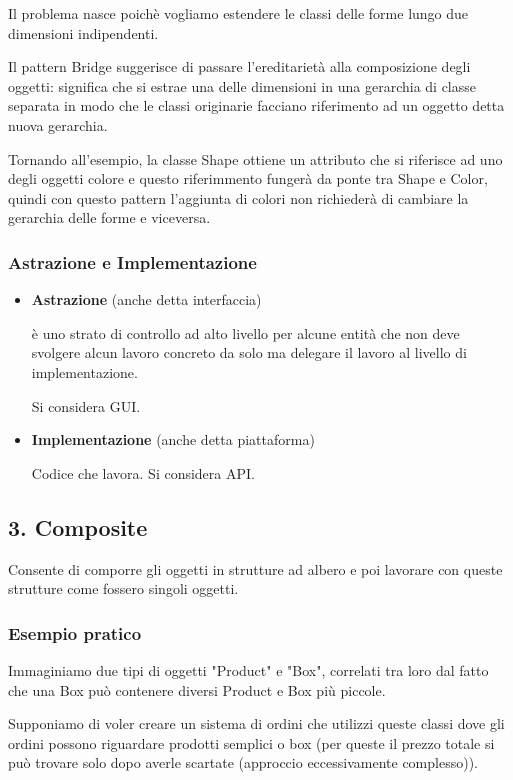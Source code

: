 \documentclass{report}
\begin{document}
\noindent
Il problema nasce poichè vogliamo estendere le classi delle forme lungo due dimensioni indipendenti.

\medskip
\noindent
Il pattern Bridge suggerisce di passare l'ereditarietà alla composizione degli oggetti: significa che si estrae una delle dimensioni in una gerarchia di classe separata in modo che le classi originarie facciano riferimento ad un oggetto detta nuova gerarchia.

\medskip
\noindent
Tornando all'esempio, la classe Shape ottiene un attributo che si riferisce ad uno degli oggetti colore e questo riferimmento fungerà da ponte tra Shape e Color, quindi con questo pattern l'aggiunta di colori non richiederà di cambiare la gerarchia delle forme e viceversa.

\subsubsection*{Astrazione e Implementazione}
\begin{itemize}
    \item \textbf{Astrazione} (anche detta interfaccia)

    \noindent
    è uno strato di controllo ad alto livello per alcune entità che non deve svolgere alcun lavoro concreto da solo ma delegare il lavoro al livello di implementazione.

    \noindent
    Si considera GUI.

    \item \textbf{Implementazione} (anche detta piattaforma)
    
    \noindent
    Codice che lavora. Si considera API.
\end{itemize}

\subsection*{3. Composite}
Consente di comporre gli oggetti in strutture ad albero e poi lavorare con queste strutture come fossero singoli oggetti.

\subsubsection*{Esempio pratico}
Immaginiamo due tipi di oggetti "Product" e "Box", correlati tra loro dal fatto che una Box può contenere diversi Product e Box più piccole.

\noindent
Supponiamo di voler creare un sistema di ordini che utilizzi queste classi dove gli ordini possono riguardare prodotti semplici o box (per queste il prezzo totale si può trovare solo dopo averle scartate (approccio eccessivamente complesso)).
\end{document}
